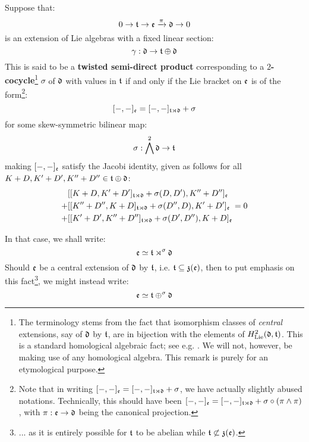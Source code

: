         \begin{definition} \label{def: twisted_semi_direct_products} 
            Suppose that:
                $$0 \to \mathfrak{t} \to \mathfrak{e} \xrightarrow[]{\pi} \mathfrak{d} \to 0$$
            is an extension of Lie algebras with a fixed linear section:
                $$\gamma: \mathfrak{d} \to \mathfrak{t} \oplus \mathfrak{d}$$
            This is said to be a \textbf{twisted semi-direct product} corresponding to a \textbf{$2$-cocycle}\footnote{The terminology stems from the fact that isomorphism classes of \textit{central} extensions, say of $\mathfrak{d}$ by $\mathfrak{t}$, are in bijection with the elements of $H^2_{\mathrm{Lie}}(\mathfrak{d}, \mathfrak{t})$. This is a standard homological algebraic fact; see e.g. \cite[Theorem VII.3.3]{hilton_stammbach_homological_algebra}. We will not, however, be making use of any homological algebra. This remark is purely for an etymological purpose.} $\sigma$ of $\mathfrak{d}$ with values in $\mathfrak{t}$ if and only if the Lie bracket on $\mathfrak{e}$ is of the form\footnote{Note that in writing $[-, -]_{\mathfrak{e}} = [-, -]_{\mathfrak{t} \rtimes \mathfrak{d}} + \sigma$, we have actually slightly abused notations. Technically, this should have been $[-, -]_{\mathfrak{e}} = [-, -]_{\mathfrak{t} \rtimes \mathfrak{d}} + \sigma \circ ( \pi \wedge \pi )$, with $\pi: \mathfrak{e} \to \mathfrak{d}$ being the canonical projection.}:
                $$[-, -]_{\mathfrak{e}} = [-, -]_{\mathfrak{t} \rtimes \mathfrak{d}} + \sigma$$
            for some skew-symmetric bilinear map:
                $$\sigma: \bigwedge^2 \mathfrak{d} \to \mathfrak{t}$$
            making $[-, -]_{\mathfrak{e}}$ satisfy the Jacobi identity, given as follows for all $K + D, K' + D', K'' + D'' \in \mathfrak{t} \oplus \mathfrak{d}$:
                $$
                    \begin{aligned}
                        & [[K + D, K' + D']_{\mathfrak{t} \rtimes \mathfrak{d}} + \sigma(D, D'), K'' + D'']_{\mathfrak{e}}
                        \\
                        + & [[K'' + D'', K + D]_{\mathfrak{t} \rtimes \mathfrak{d}} + \sigma(D'', D), K' + D']_{\mathfrak{e}}
                        \\
                        + & [[K' + D', K'' + D'']_{\mathfrak{t} \rtimes \mathfrak{d}} + \sigma(D', D''), K + D]_{\mathfrak{e}}
                    \end{aligned}
                    = 0
                $$
            
            In that case, we shall write:
                $$\mathfrak{e} \simeq \mathfrak{t} \rtimes^{\sigma} \mathfrak{d}$$
            Should $\mathfrak{e}$ be a central extension of $\mathfrak{d}$ by $\mathfrak{t}$, i.e. $\mathfrak{t} \subseteq \mathfrak{z}(\mathfrak{e})$, then to put emphasis on this fact\footnote{... as it is entirely possible for $\mathfrak{t}$ to be abelian while $\mathfrak{t} \not \subset \mathfrak{z}(\mathfrak{e})$.}, we might instead write:
                $$\mathfrak{e} \simeq \mathfrak{t} \oplus^{\sigma} \mathfrak{d}$$
        \end{definition}
